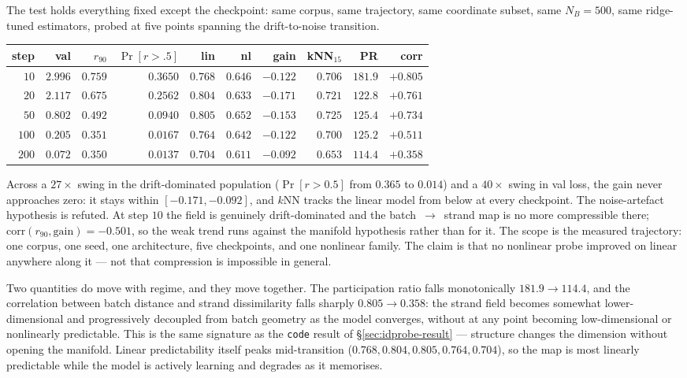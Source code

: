 The test holds everything fixed except the checkpoint: same corpus, same
trajectory, same coordinate subset, same $N_B=500$, same ridge-tuned
estimators, probed at five points spanning the drift-to-noise transition.

\begin{center}
\begin{tabular}{rrrrrrrrrr}
\hline
step & val & $r_{90}$ & $\Pr[r>.5]$ & lin & nl & gain & kNN$_{15}$ & PR & corr \\
\hline
$10$  & $2.996$ & $0.759$ & $0.3650$ & $0.768$ & $0.646$ & $-0.122$ & $0.706$ & $181.9$ & $+0.805$ \\
$20$  & $2.117$ & $0.675$ & $0.2562$ & $0.804$ & $0.633$ & $-0.171$ & $0.721$ & $122.8$ & $+0.761$ \\
$50$  & $0.802$ & $0.492$ & $0.0940$ & $0.805$ & $0.652$ & $-0.153$ & $0.725$ & $125.4$ & $+0.734$ \\
$100$ & $0.205$ & $0.351$ & $0.0167$ & $0.764$ & $0.642$ & $-0.122$ & $0.700$ & $125.2$ & $+0.511$ \\
$200$ & $0.072$ & $0.350$ & $0.0137$ & $0.704$ & $0.611$ & $-0.092$ & $0.653$ & $114.4$ & $+0.358$ \\
\hline
\end{tabular}
\end{center}

\begin{observation}
\label{obs:wall-general}
Across a $27\times$ swing in the drift-dominated population
($\Pr[r>0.5]$ from $0.365$ to $0.014$) and a $40\times$ swing in val loss, the
gain never approaches zero: it stays within $[-0.171,-0.092]$, and $k$NN tracks
the linear model from below at every checkpoint. The noise-artefact hypothesis
is refuted. At step $10$ the field is genuinely drift-dominated and the
batch~$\to$~strand map is no more compressible there;
$\mathrm{corr}(r_{90},\text{gain})=-0.501$, so the weak trend runs against the
manifold hypothesis rather than for it. The scope is the measured trajectory:
one corpus, one seed, one architecture, five checkpoints, and one nonlinear
family. The claim is that no nonlinear probe improved on linear anywhere along
it --- not that compression is impossible in general.
\end{observation}

Two quantities do move with regime, and they move together. The participation
ratio falls monotonically $181.9\to114.4$, and the correlation between batch
distance and strand dissimilarity falls sharply $0.805\to0.358$: the strand
field becomes somewhat lower-dimensional and progressively decoupled from
batch geometry as the model converges, without at any point becoming
low-dimensional or nonlinearly predictable. This is the same signature as the
\texttt{code} result of \S\ref{sec:idprobe-result} --- structure changes the
dimension without opening the manifold. Linear predictability itself peaks
mid-transition ($0.768,0.804,0.805,0.764,0.704$), so the map is most linearly
predictable while the model is actively learning and degrades as it memorises.


